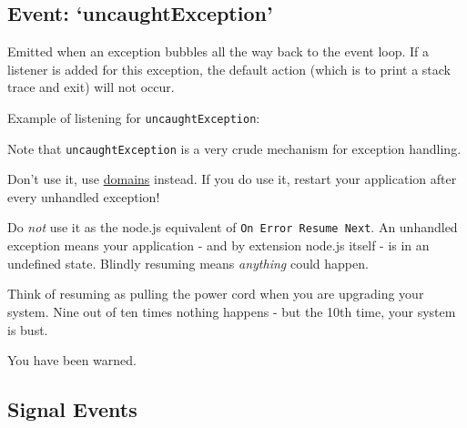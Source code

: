 \subsection{Event: `uncaughtException'}

Emitted when an exception bubbles all the way back to the event loop. If
a listener is added for this exception, the default action (which is to
print a stack trace and exit) will not occur.

Example of listening for \texttt{uncaughtException}:

\begin{Shaded}
\begin{Highlighting}[]
\NormalTok{(}\NormalTok{, }
  \NormalTok{(} 
\NormalTok{\});}

\NormalTok{() \{}
  \NormalTok{(}\NormalTok{);}
\NormalTok{\}, }\NormalTok{);}

\NormalTok{(}\NormalTok{);}
\end{Highlighting}
\end{Shaded}

Note that \texttt{uncaughtException} is a very crude mechanism for
exception handling.

Don't use it, use \href{domain.html}{domains} instead. If you do use it,
restart your application after every unhandled exception!

Do \emph{not} use it as the node.js equivalent of
\texttt{On Error Resume Next}. An unhandled exception means your
application - and by extension node.js itself - is in an undefined
state. Blindly resuming means \emph{anything} could happen.

Think of resuming as pulling the power cord when you are upgrading your
system. Nine out of ten times nothing happens - but the 10th time, your
system is bust.

You have been warned.

\subsection{Signal Events}

